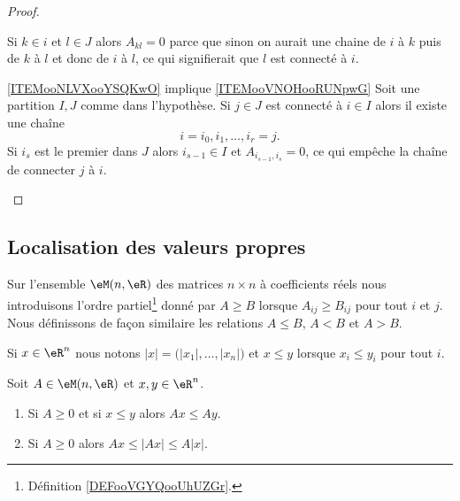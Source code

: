 \begin{proof}
\begin{subproof}
            Si \( k\in i\) et \( l\in J\) alors \( A_{kl}=0\) parce que sinon on aurait une chaine de \( i\) à \( k\) puis de \( k\) à \( l\) et donc de \( i\) à \( l\), ce qui signifierait que \( l\) est connecté à \( i\).

        \item[\ref{ITEMooNLVXooYSQKwO} implique \ref{ITEMooVNOHooRUNpwG}]
            Soit une partition \( I,J\) comme dans l'hypothèse. Si \( j\in J\) est connecté à \( i\in I\) alors il existe une chaîne
            \begin{equation}
                i=i_0,i_1,\ldots, i_r=j.
            \end{equation}
            Si \( i_s\) est le premier dans \( J\) alors \( i_{s-1}\in I\) et \( A_{i_{s-1},i_s}=0\), ce qui empêche la chaîne de connecter \( j\) à \( i\).
    \end{subproof}
\end{proof}

\subsection{Localisation des valeurs propres}

Sur l'ensemble \( \eM(n,\eR)\) des matrices \( n\times n\) à coefficients réels nous introduisons l'ordre partiel\footnote{Définition \ref{DEFooVGYQooUhUZGr}.} donné par \( A\geq B\) lorsque \( A_{ij}\geq B_{ij}\) pour tout \( i\) et \( j\). Nous définissons de façon similaire les relations \( A\leq B\), \( A<B\) et \( A>B\).

Si \( x\in \eR^n\) nous notons \( | x |=\big( | x_1 |,\ldots, | x_n | \big)\) et \( x\leq y\) lorsque \( x_i\leq y_i\) pour tout \( i\).

\begin{proposition}     \label{PROPooGVRVooZEvKcn}
    Soit \( A\in \eM(n,\eR)\) et \( x,y\in \eR^n\).
    \begin{enumerate}
        \item       \label{ITEMooXQOPooPVLjFh}
            Si \( A\geq 0\) et si \( x\leq y\) alors \( Ax\leq Ay\).
        \item       \label{ITEMooQLCJooKIbws}
            Si \( A\geq 0\) alors \( Ax\leq | Ax |\leq A| x |\).
    \end{enumerate}
\end{proposition}

